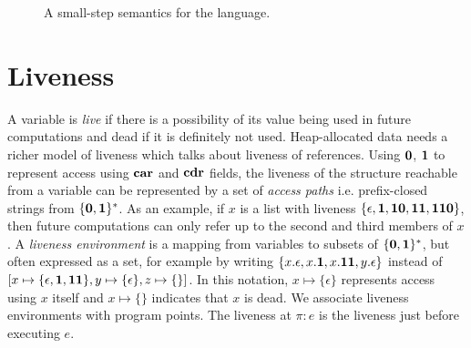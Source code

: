 \documentclass[9pt]{sigplanconf}
\begin{document}
\begin{figure}[t!]
\begin{center}
\caption{A small-step semantics for the language. \label{fig:lang-semantics}}
\end{center}
\end{figure}


\renewcommand{\pp}[2]{\ensuremath{#1\!\!:\!#2}} %



\section{Liveness}\label{sec:liveness}

A variable is {\em live} if  there is a possibility of its value being
used in  future computations  and dead if  it is definitely  not used.
Heap-allocated data needs a richer model of liveness which talks about
liveness  of references.   Using  $\mathbf{0}$, $\mathbf{1}$  to represent  access
using  $\mbox{$\mathbf{car}$}$  and  $\mbox{$\mathbf{cdr}$}$  fields,  the  liveness  of  the  structure
reachable from a  variable can be represented by a  set of {\em access
  paths} i.e.  prefix-closed  strings from $\{\mathbf{0},\mathbf{1}\}^\ast$.  As
an  example,  if $x$  is  a  list  with liveness  $\{\epsilon,  \mathbf{1},
\mathbf{1}\mathbf{0},  \mathbf{1}\mathbf{1}, \mathbf{1}\mathbf{1}\mathbf{0}\}$, then  future computations
can only  refer up  to the second  and third  members of $x$.   A {\em
  liveness  environment} is  a mapping  from variables  to  subsets of
$\{\mathbf{0},\mathbf{1}\}^\ast$, but  often expressed as a set,  for example by
writing $\{x.\epsilon, x.\mathbf{1}, x.\mathbf{1}\mathbf{1}, y.\epsilon\}$ instead of
$[x     \mapsto\{\epsilon,\mathbf{1},\mathbf{1}\mathbf{1}\},    y\mapsto\{\epsilon\},
  z\mapsto\{\}]$.    In  this   notation,  $x   \mapsto  \{\epsilon\}$
represents access using $x$ itself and $x \mapsto \{\}$ indicates that
$x$ is dead.  We  associate liveness environments with program points.
The liveness at $\pi:e$ is the liveness just before executing $e$.
\end{document}
